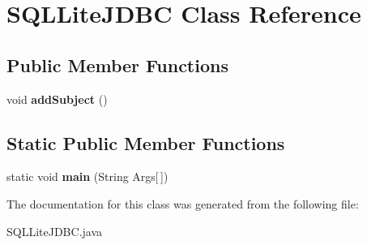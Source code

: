 \hypertarget{class_s_q_l_lite_j_d_b_c}{\section{S\-Q\-L\-Lite\-J\-D\-B\-C Class Reference}
\label{class_s_q_l_lite_j_d_b_c}
}
\subsection*{Public Member Functions}
\begin{DoxyCompactItemize}
\item 
\hypertarget{class_s_q_l_lite_j_d_b_c_a89c1b8a12ba9200577696e7d5fe5df0f}{void {\bfseries add\-Subject} ()}\label{class_s_q_l_lite_j_d_b_c_a89c1b8a12ba9200577696e7d5fe5df0f}

\end{DoxyCompactItemize}
\subsection*{Static Public Member Functions}
\begin{DoxyCompactItemize}
\item 
\hypertarget{class_s_q_l_lite_j_d_b_c_ae7fec1eef400030b954ed3a58ed1a857}{static void {\bfseries main} (String Args\mbox{[}$\,$\mbox{]})}\label{class_s_q_l_lite_j_d_b_c_ae7fec1eef400030b954ed3a58ed1a857}

\end{DoxyCompactItemize}


The documentation for this class was generated from the following file\-:\begin{DoxyCompactItemize}
\item 
S\-Q\-L\-Lite\-J\-D\-B\-C.\-java\end{DoxyCompactItemize}
